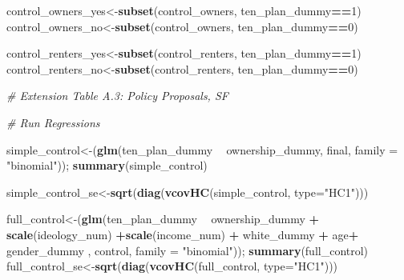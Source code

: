 \documentclass[]{article}
\newenvironment{Shaded}{\begin{snugshade}}{\end{snugshade}}
\newcommand{\CommentTok}[1]{\textcolor[rgb]{0.56,0.35,0.01}{\textit{#1}}}
\newcommand{\DataTypeTok}[1]{\textcolor[rgb]{0.13,0.29,0.53}{#1}}
\newcommand{\DecValTok}[1]{\textcolor[rgb]{0.00,0.00,0.81}{#1}}
\newcommand{\KeywordTok}[1]{\textcolor[rgb]{0.13,0.29,0.53}{\textbf{#1}}}
\newcommand{\NormalTok}[1]{#1}
\newcommand{\OperatorTok}[1]{\textcolor[rgb]{0.81,0.36,0.00}{\textbf{#1}}}
\newcommand{\StringTok}[1]{\textcolor[rgb]{0.31,0.60,0.02}{#1}}
\begin{document}
\begin{Shaded}
\begin{Highlighting}[]
\NormalTok{control_owners_yes<-}\KeywordTok{subset}\NormalTok{(control_owners, ten_plan_dummy}\OperatorTok{==}\DecValTok{1}\NormalTok{)}
\NormalTok{control_owners_no<-}\KeywordTok{subset}\NormalTok{(control_owners, ten_plan_dummy}\OperatorTok{==}\DecValTok{0}\NormalTok{)}

\NormalTok{control_renters_yes<-}\KeywordTok{subset}\NormalTok{(control_renters, ten_plan_dummy}\OperatorTok{==}\DecValTok{1}\NormalTok{)}
\NormalTok{control_renters_no<-}\KeywordTok{subset}\NormalTok{(control_renters, ten_plan_dummy}\OperatorTok{==}\DecValTok{0}\NormalTok{)}


\CommentTok{# Extension Table A.3: Policy Proposals, SF}

\CommentTok{# Run Regressions}

\NormalTok{simple_control<-(}\KeywordTok{glm}\NormalTok{(ten_plan_dummy }\OperatorTok{~}\StringTok{ }\NormalTok{ownership_dummy, final, }\DataTypeTok{family =} \StringTok{"binomial"}\NormalTok{)); }\KeywordTok{summary}\NormalTok{(simple_control)}

\NormalTok{simple_control_se<-}\KeywordTok{sqrt}\NormalTok{(}\KeywordTok{diag}\NormalTok{(}\KeywordTok{vcovHC}\NormalTok{(simple_control, }\DataTypeTok{type=}\StringTok{"HC1"}\NormalTok{)))}

\NormalTok{full_control<-(}\KeywordTok{glm}\NormalTok{(ten_plan_dummy }\OperatorTok{~}\StringTok{ }\NormalTok{ownership_dummy  }\OperatorTok{+}\StringTok{  }\KeywordTok{scale}\NormalTok{(ideology_num) }\OperatorTok{+}\KeywordTok{scale}\NormalTok{(income_num) }\OperatorTok{+}\StringTok{ }\NormalTok{white_dummy  }\OperatorTok{+}\StringTok{ }\NormalTok{age}\OperatorTok{+}\StringTok{ }\NormalTok{gender_dummy , control, }\DataTypeTok{family =} \StringTok{"binomial"}\NormalTok{)); }\KeywordTok{summary}\NormalTok{(full_control)}
\NormalTok{full_control_se<-}\KeywordTok{sqrt}\NormalTok{(}\KeywordTok{diag}\NormalTok{(}\KeywordTok{vcovHC}\NormalTok{(full_control, }\DataTypeTok{type=}\StringTok{"HC1"}\NormalTok{)))}


\end{Highlighting}
\end{Shaded}
\end{document}
